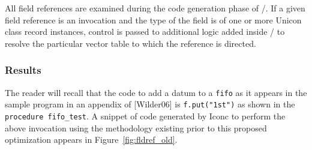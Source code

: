 All field references are examined during the code generation phase of \Ic/. If
a given field reference is an invocation and the type of the field is of one or
more Unicon class record instances, control is passed to additional logic
added inside \Ic/ to resolve the particular vector table to which the reference
is directed.

\subsubsection{Results}
The reader will recall that the code to add a datum to a \texttt{fifo}
as it appears in the sample program in an appendix of [Wilder06] is
\texttt{f.put("1st")} as shown in the \texttt{procedure fifo\_test}.
A snippet of code generated by Iconc to perform the above invocation using the
methodology existing prior to this proposed optimization appears in
Figure~\ref{fig:fldref_old}.
